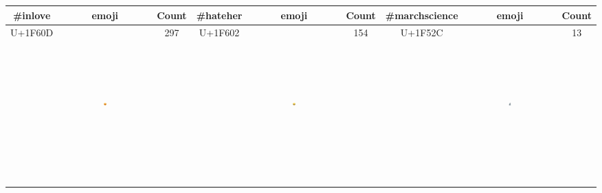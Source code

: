 \documentclass[]{article}
\begin{document}
\begin{table}[htbp]
\centering
\begin{tabular}{ccccccccc}
  \hline
  \#inlove & emoji & Count & \#hateher & emoji & Count & \#marchscience & emoji & Count \\ 
  \hline
U+1F60D & \includegraphics[width=0.03\textwidth, height=60mm]{images/U+1F60D.png} & 297 & U+1F602 & \includegraphics[width=0.03\textwidth, height=60mm]{images/U+1F602.png} & 154 & U+1F52C &  \includegraphics[width=0.03\textwidth, height=60mm]{images/U+1F52C.png} & 13 \\ 

\end{tabular}
\end{table}
\end{document}

